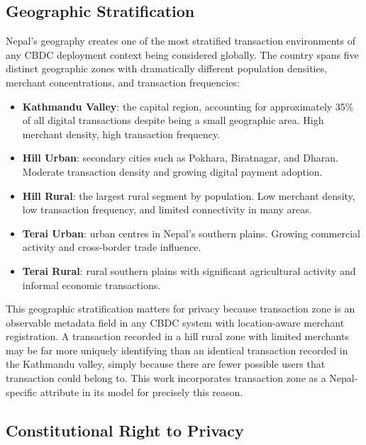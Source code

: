 \subsection{Geographic Stratification}

Nepal's geography creates one of the most stratified
transaction environments of any CBDC deployment context
being considered globally. The country spans five distinct
geographic zones with dramatically different population
densities, merchant concentrations, and transaction
frequencies:

\begin{itemize}
    \item \textbf{Kathmandu Valley}: the capital region,
    accounting for approximately 35\% of all digital
    transactions despite being a small geographic area.
    High merchant density, high transaction frequency.

    \item \textbf{Hill Urban}: secondary cities such as
    Pokhara, Biratnagar, and Dharan. Moderate transaction
    density and growing digital payment adoption.

    \item \textbf{Hill Rural}: the largest rural segment
    by population. Low merchant density, low transaction
    frequency, and limited connectivity in many areas.

    \item \textbf{Terai Urban}: urban centres in Nepal's
    southern plains. Growing commercial activity and
    cross-border trade influence.

    \item \textbf{Terai Rural}: rural southern plains
    with significant agricultural activity and informal
    economic transactions.
\end{itemize}

This geographic stratification matters for privacy because
transaction zone is an observable metadata field in any
CBDC system with location-aware merchant registration.
A transaction recorded in a hill rural zone with limited
merchants may be far more uniquely identifying than an
identical transaction recorded in the Kathmandu valley,
simply because there are fewer possible users that
transaction could belong to. This work incorporates
transaction zone as a Nepal-specific attribute in its
model for precisely this reason.

\subsection{Constitutional Right to Privacy}

